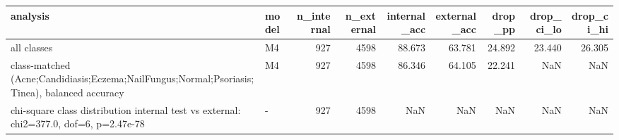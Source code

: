 \begin{tabular}{llrrrrrrr}
\toprule
analysis & model & n\_internal & n\_external & internal\_acc & external\_acc & drop\_pp & drop\_ci\_lo & drop\_ci\_hi \\
\midrule
all classes & M4 & 927 & 4598 & 88.673 & 63.781 & 24.892 & 23.440 & 26.305 \\
class-matched (Acne;Candidiasis;Eczema;NailFungus;Normal;Psoriasis;Tinea), balanced accuracy & M4 & 927 & 4598 & 86.346 & 64.105 & 22.241 & NaN & NaN \\
chi-square class distribution internal test vs external: chi2=377.0, dof=6, p=2.47e-78 & - & 927 & 4598 & NaN & NaN & NaN & NaN & NaN \\
\bottomrule
\end{tabular}
